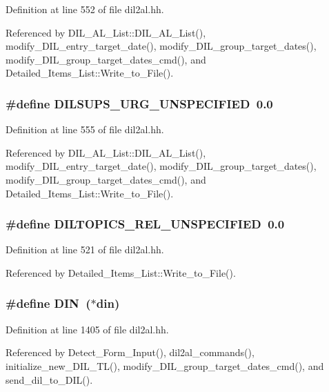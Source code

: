 Definition at line 552 of file dil2al.hh.

Referenced by DIL\_\-AL\_\-List::DIL\_\-AL\_\-List(), modify\_\-DIL\_\-entry\_\-target\_\-date(), modify\_\-DIL\_\-group\_\-target\_\-dates(), modify\_\-DIL\_\-group\_\-target\_\-dates\_\-cmd(), and Detailed\_\-Items\_\-List::Write\_\-to\_\-File().
\subsubsection{\setlength{\rightskip}{0pt plus 5cm}\#define DILSUPS\_\-URG\_\-UNSPECIFIED\ 0.0}\label{dil2al_8hh_a27}




Definition at line 555 of file dil2al.hh.

Referenced by DIL\_\-AL\_\-List::DIL\_\-AL\_\-List(), modify\_\-DIL\_\-entry\_\-target\_\-date(), modify\_\-DIL\_\-group\_\-target\_\-dates(), modify\_\-DIL\_\-group\_\-target\_\-dates\_\-cmd(), and Detailed\_\-Items\_\-List::Write\_\-to\_\-File().
\subsubsection{\setlength{\rightskip}{0pt plus 5cm}\#define DILTOPICS\_\-REL\_\-UNSPECIFIED\ 0.0}\label{dil2al_8hh_a21}




Definition at line 521 of file dil2al.hh.

Referenced by Detailed\_\-Items\_\-List::Write\_\-to\_\-File().
\subsubsection{\setlength{\rightskip}{0pt plus 5cm}\#define DIN\ ($\ast${\bf din})}\label{dil2al_8hh_a106}




Definition at line 1405 of file dil2al.hh.

Referenced by Detect\_\-Form\_\-Input(), dil2al\_\-commands(), initialize\_\-new\_\-DIL\_\-TL(), modify\_\-DIL\_\-group\_\-target\_\-dates\_\-cmd(), and send\_\-dil\_\-to\_\-DIL().
